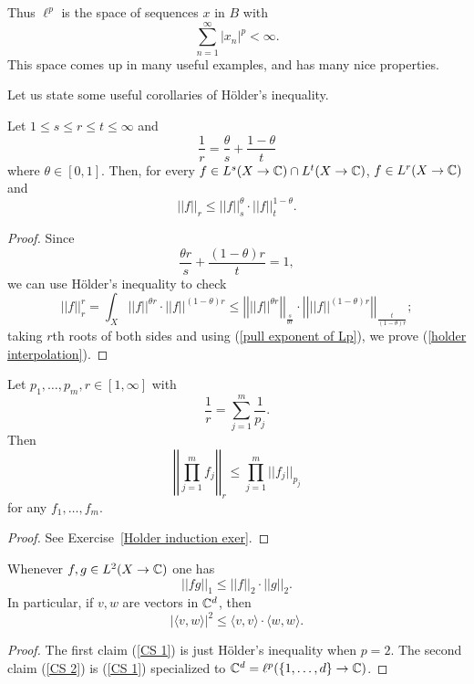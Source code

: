 Thus $\ell^{p}$ is the space of sequences $x$ in $B$ with
\[\sum_{n = 1}^{\infty} |x_{n}|^{p} < \infty.\]
This space comes up in many useful examples, and has many nice properties.

Let us state some useful corollaries of H\"older's inequality.
\begin{corollary}
Let $1 \leq s \leq r \leq t \leq \infty$ and
\[\frac{1}{r} = \frac{\theta}{s} + \frac{1 - \theta}{t}\]
where $\theta \in [0, 1]$. Then, for every $f \in L^{s}(X \to \mathbb{C}) \cap L^{t}(X \to \mathbb{C})$, $f \in L^{r}(X \to \mathbb{C})$ and
\begin{equation}\label{holder interpolation}
||f||_{r} \leq ||f||_{s}^{\theta} \cdot ||f||_{t}^{1-\theta}.
\end{equation}
\end{corollary}
\begin{proof}
Since
\[\frac{\theta r}{s} + \frac{(1 - \theta)r}{t} = 1,\]
we can use H\"older's inequality to check
\[||f||_{r}^{r} = \int_{X} ||f||^{\theta r} \cdot ||f||^{(1 - \theta)r} \leq \left|\left|||f||^{\theta r}\right|\right|_{\frac{s}{\theta r}} \cdot \left|\left|||f||^{(1 - \theta) r}\right|\right|_{\frac{t}{(1 - \theta)r}};\]
taking $r$th roots of both sides and using (\ref{pull exponent of Lp}), we prove (\ref{holder interpolation}).
\end{proof}

\begin{corollary}\label{Holder induction}
Let $p_{1}, \dots, p_{m}, r \in [1, \infty]$ with
\[\frac{1}{r} = \sum_{j=1}^{m} \frac{1}{p_{j}}.\]
Then
\[\left|\left|\prod_{j=1}^{m} f_{j}\right|\right|_{r} \leq \prod_{j=1}^{m} ||f_{j}||_{p_{j}}\]
for any $f_{1}, \dots, f_{m}$.
\end{corollary}
\begin{proof}
See Exercise~\ref{Holder induction exer}.
\end{proof}

\begin{corollary}
Whenever $f, g \in L^{2}(X \to \mathbb{C})$ one has
\begin{equation}\label{CS 1}
||fg||_{1} \leq ||f||_{2} \cdot ||g||_{2}.
\end{equation}
In particular, if $v, w$ are vectors in $\mathbb{C}^{d}$, then
\begin{equation}\label{CS 2}
|\langle v, w\rangle|^{2} \leq \langle v, v\rangle \cdot \langle w, w\rangle.
\end{equation}
\end{corollary}
\begin{proof}
The first claim (\ref{CS 1}) is just H\"older's inequality when $p = 2$.
The second claim (\ref{CS 2}) is (\ref{CS 1}) specialized to $\mathbb{C}^{d} = \ell^{p}(\{1, \dots, d\} \to \mathbb{C})$.
\end{proof}

